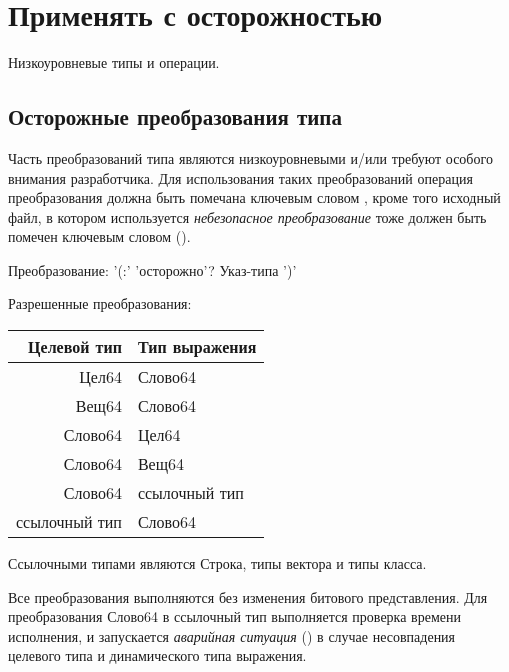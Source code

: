 \hypertarget{unsafe}{%
\section{Применять с осторожностью}\label{unsafe:chapter}}

Низкоуровневые типы и операции.

\hypertarget{unsafe-conversions}{%
\subsection{Осторожные преобразования типа}\label{unsafe:conversions}}

Часть преобразований типа являются низкоуровневыми и/или требуют особого внимания разработчика. 
Для использования таких преобразований операция преобразования должна быть помечана ключевым словом , 
кроме того исходный файл, в котором используется \emph{небезопасное преобразование} тоже должен быть помечен  ключевым словом  ().

\begin{Grammar}
Преобразование: '(:' 'осторожно'? Указ-типа ')'
\end{Grammar}   

Разрешенные преобразования:

\smallskip
\begin{tabular}[c]{r|l}
\textbf{Целевой тип} & \textbf{Тип выражения}  \\ 
\hline
Цел64 & Слово64  \\
Вещ64 & Слово64  \\
Слово64 & Цел64  \\
Слово64 & Вещ64  \\
Слово64 & ссылочный тип  \\
ссылочный тип & Слово64 \\
\hline
\end{tabular}

\bigskip
Ссылочными типами являются Строка, типы вектора и типы класса.

Все преобразования выполняются  без изменения битового представления. 
Для преобразования Слово64 в ссылочный тип выполняется проверка времени исполнения, 
и запускается \emph{аварийная ситуация} () в случае несовпадения целевого типа и динамического типа выражения.
